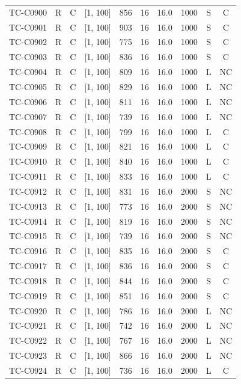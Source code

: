 \begin{longtable}{lccccccccc}
TC-C0900 & R & C & [1, 100] & 856 & 16 & 16.0 & 1000 & S & C \\
TC-C0901 & R & C & [1, 100] & 903 & 16 & 16.0 & 1000 & S & C \\
TC-C0902 & R & C & [1, 100] & 775 & 16 & 16.0 & 1000 & S & C \\
TC-C0903 & R & C & [1, 100] & 836 & 16 & 16.0 & 1000 & S & C \\
TC-C0904 & R & C & [1, 100] & 809 & 16 & 16.0 & 1000 & L & NC \\
TC-C0905 & R & C & [1, 100] & 829 & 16 & 16.0 & 1000 & L & NC \\
TC-C0906 & R & C & [1, 100] & 811 & 16 & 16.0 & 1000 & L & NC \\
TC-C0907 & R & C & [1, 100] & 739 & 16 & 16.0 & 1000 & L & NC \\
TC-C0908 & R & C & [1, 100] & 799 & 16 & 16.0 & 1000 & L & C \\
TC-C0909 & R & C & [1, 100] & 821 & 16 & 16.0 & 1000 & L & C \\
TC-C0910 & R & C & [1, 100] & 840 & 16 & 16.0 & 1000 & L & C \\
TC-C0911 & R & C & [1, 100] & 833 & 16 & 16.0 & 1000 & L & C \\
TC-C0912 & R & C & [1, 100] & 831 & 16 & 16.0 & 2000 & S & NC \\
TC-C0913 & R & C & [1, 100] & 773 & 16 & 16.0 & 2000 & S & NC \\
TC-C0914 & R & C & [1, 100] & 819 & 16 & 16.0 & 2000 & S & NC \\
TC-C0915 & R & C & [1, 100] & 739 & 16 & 16.0 & 2000 & S & NC \\
TC-C0916 & R & C & [1, 100] & 835 & 16 & 16.0 & 2000 & S & C \\
TC-C0917 & R & C & [1, 100] & 836 & 16 & 16.0 & 2000 & S & C \\
TC-C0918 & R & C & [1, 100] & 844 & 16 & 16.0 & 2000 & S & C \\
TC-C0919 & R & C & [1, 100] & 851 & 16 & 16.0 & 2000 & S & C \\
TC-C0920 & R & C & [1, 100] & 786 & 16 & 16.0 & 2000 & L & NC \\
TC-C0921 & R & C & [1, 100] & 742 & 16 & 16.0 & 2000 & L & NC \\
TC-C0922 & R & C & [1, 100] & 767 & 16 & 16.0 & 2000 & L & NC \\
TC-C0923 & R & C & [1, 100] & 866 & 16 & 16.0 & 2000 & L & NC \\
TC-C0924 & R & C & [1, 100] & 736 & 16 & 16.0 & 2000 & L & C \\

\end{longtable}
